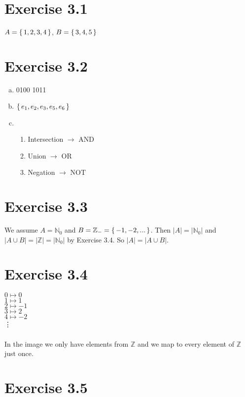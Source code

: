 \documentclass{article} %
\newcommand{\homeworkNumber}{3}
\begin{document}
\section*{Exercise \homeworkNumber.1}

$A = \set{1,2,3,4}$, $B = \set{3,4,5}$

\section*{Exercise \homeworkNumber.2}

\begin{enumerate}[a)]
	\item 0100 1011
	\item $\set{e_1, e_2, e_3, e_5, e_6}$
	\item 
	\begin{enumerate}[]
		\item Intersection $\rightarrow$ AND
		\item Union $\rightarrow$ OR
		\item Negation $\rightarrow$ NOT
	\end{enumerate}
\end{enumerate}


\section*{Exercise \homeworkNumber.3}

We assume $A = \mathbb{N}_0$ and $B = \mathbb{Z}_- = \set{-1, -2, ...}$. Then $|A| = |\mathbb{N}_0|$ and $|A \cup B| = |\mathbb{Z}| = |\mathbb{N}_0|$ by Exercise 3.4. So $|A| = |A \cup B|$.

\section*{Exercise \homeworkNumber.4}

$0 \mapsto 0$\\
$1 \mapsto 1$\\
$2 \mapsto -1$\\
$3 \mapsto 2$\\
$4 \mapsto -2$\\
\vdots\\\\
In the image we only have elements from $\mathbb{Z}$ and we map to every element of $\mathbb{Z}$ just once.

\section*{Exercise \homeworkNumber.5}
\end{document}
